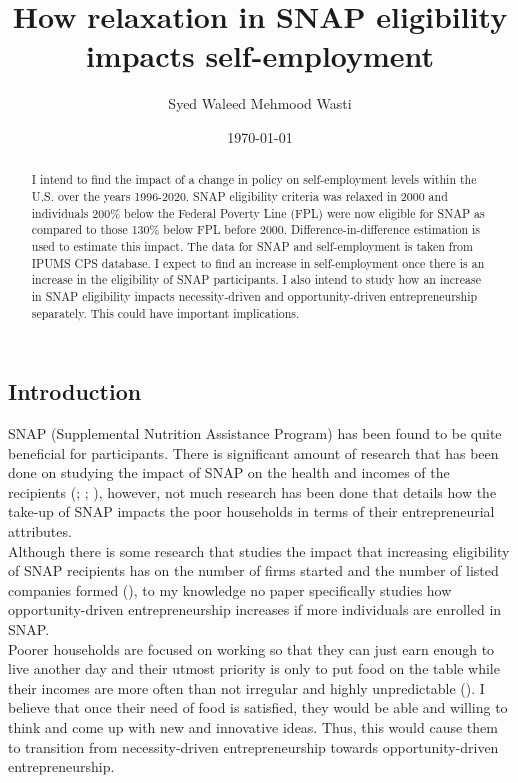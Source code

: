 \documentclass[12pt]{article}
\title{\textbf{How relaxation in SNAP eligibility impacts self-employment}}
\author{Syed Waleed Mehmood Wasti}
\date{\today}
\begin{document}
\begin{titlingpage}
\maketitle
\begin{abstract}
\noindent 
I intend to find the impact of a change in policy on self-employment levels within the U.S. over the years 1996-2020. SNAP eligibility criteria was relaxed in 2000 and individuals 200\% below the Federal Poverty Line (FPL) were now eligible for SNAP as compared to those 130\% below FPL before 2000.  Difference-in-difference estimation is used to estimate this impact. The data for SNAP and self-employment is taken from IPUMS CPS database. I expect to find an increase in self-employment once there is an increase in the eligibility of SNAP participants. I also intend to study how an increase in SNAP eligibility impacts necessity-driven and opportunity-driven entrepreneurship separately. This could have important implications. 
 
\end{abstract}

\newpage
\tableofcontents


\newpage


\section*{Introduction}

SNAP (Supplemental Nutrition Assistance Program) has been found to be quite beneficial for participants. There is significant amount of research that has been done on studying the impact of SNAP on the health and incomes of the recipients (\cite{tiehen2012alleviating}; \cite{hoynes2017real}; \cite{bartfeld2015snap}), however, not much research has been done that details how the take-up of SNAP impacts the poor households in terms of their entrepreneurial attributes.\\ 

Although there is some research that studies the impact that increasing eligibility of SNAP recipients has on the number of firms started and the number of listed companies formed (\cite{olds2016food}), to my knowledge no paper specifically studies how opportunity-driven entrepreneurship increases if more individuals are enrolled in SNAP. \\

Poorer households are focused on working so that they can just earn enough to live another day and their utmost priority is only to put food on the table while their incomes are more often than not irregular and highly unpredictable (\cite{collins2009portfolios}). I believe that once their need of food is satisfied, they would be able and willing to think and come up with new and innovative ideas. Thus, this would cause them to transition from necessity-driven entrepreneurship towards opportunity-driven entrepreneurship. \\


\end{titlingpage}
\end{document}
